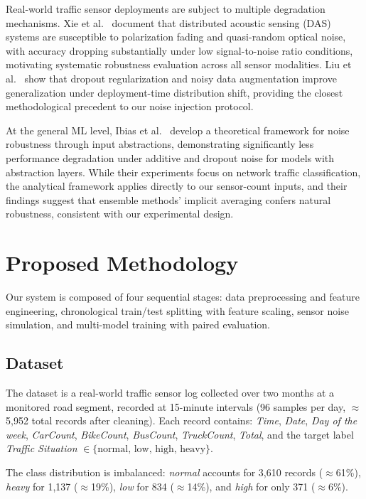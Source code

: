 \documentclass[conference,onecolumn,12pt]{IEEEtran}
\begin{document}
Real-world traffic sensor deployments are subject to multiple degradation
mechanisms. Xie et al.~\cite{xie2024} document that distributed acoustic
sensing (DAS) systems are susceptible to polarization fading and quasi-random
optical noise, with accuracy dropping substantially under low
signal-to-noise ratio conditions, motivating systematic robustness
evaluation across all sensor modalities. Liu et al.~\cite{liu2024} show that
dropout regularization and noisy data augmentation improve generalization under
deployment-time distribution shift, providing the closest methodological
precedent to our noise injection protocol.

At the general ML level, Ibias et al.~\cite{ibias2024} develop a theoretical
framework for noise robustness through input abstractions, demonstrating
significantly less performance degradation under additive and dropout noise
for models with abstraction layers. While their experiments focus on network
traffic classification, the analytical framework applies directly to our
sensor-count inputs, and their findings suggest that ensemble methods' implicit
averaging confers natural robustness, consistent with our experimental design.

\section{Proposed Methodology}
\label{sec:methodology}

Our system is composed of four sequential stages: data preprocessing and
feature engineering, chronological train/test splitting with feature scaling,
sensor noise simulation, and multi-model training with paired evaluation.

\subsection{Dataset}

The dataset is a real-world traffic sensor log collected over two months at a
monitored road segment, recorded at 15-minute intervals (96 samples per day,
$\approx$5,952 total records after cleaning). Each record contains:
\emph{Time}, \emph{Date}, \emph{Day of the week}, \emph{CarCount},
\emph{BikeCount}, \emph{BusCount}, \emph{TruckCount}, \emph{Total}, and the
target label \emph{Traffic Situation}
$\in \{\text{normal},\,\text{low},\,\text{high},\,\text{heavy}\}$.

The class distribution is imbalanced: \emph{normal} accounts for 3,610
records ($\approx$61\%), \emph{heavy} for 1,137 ($\approx$19\%), \emph{low}
for 834 ($\approx$14\%), and \emph{high} for only 371 ($\approx$6\%).
\end{document}
